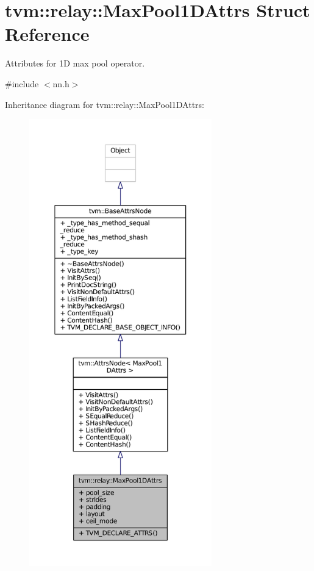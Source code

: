 \hypertarget{structtvm_1_1relay_1_1MaxPool1DAttrs}{}\section{tvm\+:\+:relay\+:\+:Max\+Pool1\+D\+Attrs Struct Reference}
\label{structtvm_1_1relay_1_1MaxPool1DAttrs}


Attributes for 1D max pool operator.  




{\ttfamily \#include $<$nn.\+h$>$}



Inheritance diagram for tvm\+:\+:relay\+:\+:Max\+Pool1\+D\+Attrs\+:
\nopagebreak
\begin{figure}[H]
\begin{center}
\leavevmode
\includegraphics[height=550pt]{structtvm_1_1relay_1_1MaxPool1DAttrs__inherit__graph}
\end{center}
\end{figure}


